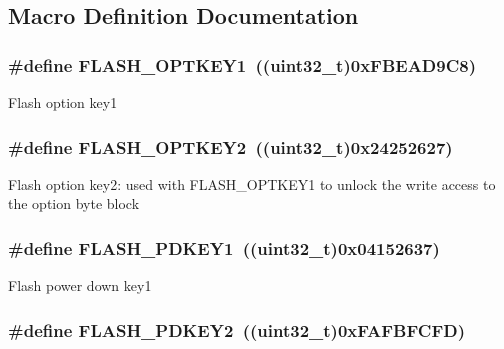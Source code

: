 \subsection{Macro Definition Documentation}
\hypertarget{group___f_l_a_s_h___keys_ga1630c4f338daf2741daa1273f657164f}{
\subsubsection[{F\-L\-A\-S\-H\-\_\-\-O\-P\-T\-K\-E\-Y1}]{\setlength{\rightskip}{0pt plus 5cm}\#define F\-L\-A\-S\-H\-\_\-\-O\-P\-T\-K\-E\-Y1~((uint32\-\_\-t)0x\-F\-B\-E\-A\-D9\-C8)}}\label{group___f_l_a_s_h___keys_ga1630c4f338daf2741daa1273f657164f}
Flash option key1 \hypertarget{group___f_l_a_s_h___keys_gae0da3085d59cf73089bfb1a2b9d9367d}{
\subsubsection[{F\-L\-A\-S\-H\-\_\-\-O\-P\-T\-K\-E\-Y2}]{\setlength{\rightskip}{0pt plus 5cm}\#define F\-L\-A\-S\-H\-\_\-\-O\-P\-T\-K\-E\-Y2~((uint32\-\_\-t)0x24252627)}}\label{group___f_l_a_s_h___keys_gae0da3085d59cf73089bfb1a2b9d9367d}
Flash option key2\-: used with F\-L\-A\-S\-H\-\_\-\-O\-P\-T\-K\-E\-Y1 to unlock the write access to the option byte block \hypertarget{group___f_l_a_s_h___keys_ga75e165b072d1c66e15bab68f4b5bb969}{
\subsubsection[{F\-L\-A\-S\-H\-\_\-\-P\-D\-K\-E\-Y1}]{\setlength{\rightskip}{0pt plus 5cm}\#define F\-L\-A\-S\-H\-\_\-\-P\-D\-K\-E\-Y1~((uint32\-\_\-t)0x04152637)}}\label{group___f_l_a_s_h___keys_ga75e165b072d1c66e15bab68f4b5bb969}
Flash power down key1 \hypertarget{group___f_l_a_s_h___keys_ga4fac68eedf8c34c59d1953525819748d}{
\subsubsection[{F\-L\-A\-S\-H\-\_\-\-P\-D\-K\-E\-Y2}]{\setlength{\rightskip}{0pt plus 5cm}\#define F\-L\-A\-S\-H\-\_\-\-P\-D\-K\-E\-Y2~((uint32\-\_\-t)0x\-F\-A\-F\-B\-F\-C\-F\-D)}}\label{group___f_l_a_s_h___keys_ga4fac68eedf8c34c59d1953525819748d}

